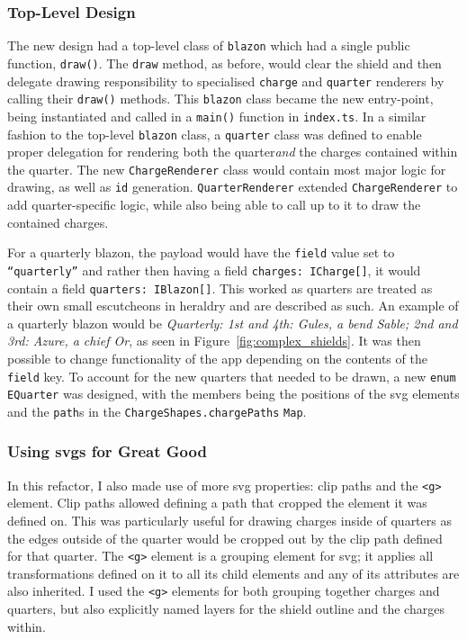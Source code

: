 \documentclass[nobib, a4paper, twoside, justified]{tufte-book}
\makeatletter
\newcommand{\svg}{\gls{svg}\@\xspace}
\newcommand{\svgs}{\glspl{svg}\@\xspace}
\newcommand{\charge}{\gls{charge}\@\xspace}
\newcommand{\charges}{\glspl{charge}\@\xspace}
\newcommand{\quarter}{\gls{quarter}\@\xspace}
\newcommand{\quarters}{\glspl{quarter}\@\xspace}
\newcommand{\blazon}{\gls{blazon}\@\xspace}
\newcommand{\ublazon}{\Gls{blazon}\@\xspace}
\newcommand{\payload}{\gls{payload}\@\xspace}
\makeatother
\begin{document}
\subsubsection{Top-Level Design}%
\label{ssub:top_level_design}

The new design had a top-level class of \texttt{\ublazon} which had a single public function,
\texttt{draw()}. The \texttt{draw} method, as before, would clear the shield and then delegate
drawing responsibility to specialised \texttt{\charge} and \texttt{\quarter} renderers by calling
their \texttt{draw()} methods. This \texttt{\ublazon} class became the new entry-point, being
instantiated and called in a \texttt{main()} function in \texttt{index.ts}. In a similar fashion to
the top-level \texttt{\ublazon} class, a \texttt{\Gls{quarter}} class was defined to enable proper
delegation for rendering both the \quarter \textit{and} the \charges contained within the quarter.
The new \texttt{ChargeRenderer} class would contain most major logic for drawing, as well as
\texttt{id} generation. \texttt{QuarterRenderer} extended \texttt{ChargeRenderer} to add
\quarter-specific logic, while also being able to call up to it to draw the contained \charges.

For a quarterly \blazon, the \payload would have the \texttt{\gls{field}} value set to
\texttt{``quarterly''} and rather then having a field \texttt{charges: ICharge[]}, it would contain
a field \texttt{quarters: IBlazon[]}. This worked as \quarters are treated as their own small
\glspl{escutcheon} in heraldry and are described as such. An example of a quarterly \blazon would
be \textit{Quarterly: 1st and 4th: Gules, a bend Sable; 2nd and 3rd: Azure, a chief Or}, as seen in
Figure~\ref{fig:complex_shields}. It was then possible to change functionality of the app depending
on the contents of the \texttt{field} key. To account for the new quarters that needed to be drawn,
a new \texttt{enum} \texttt{EQuarter} was designed, with the members being the positions of the
\svg elements and the \texttt{path}s in the \texttt{ChargeShapes.chargePaths} \texttt{Map}.

\subsubsection{Using \svgs for Great Good}%
\label{ssub:using_svg_for_great_good}

In this refactor, I also made use of more \svg properties: clip paths and the \texttt{<g>} element.
Clip paths allowed defining a path that cropped the element it was defined on. This was
particularly useful for drawing \charges inside of \quarters as the edges outside of the \quarter
would be cropped out by the clip path defined for that \quarter. The \texttt{<g>} element is a
grouping element for \svg; it applies all transformations defined on it to all its child elements
and any of its attributes are also inherited. I used the \texttt{<g>} elements for both grouping
together charges and quarters, but also explicitly named layers for the shield outline and the
\charges within.
\end{document}
